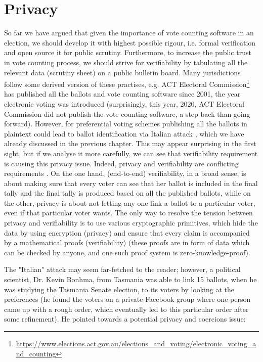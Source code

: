 \section{Privacy}
   So far we have argued that given the  importance of vote counting software in an election, we should 
   develop it with highest possible rigour, i.e. formal verification and open source it for public scrutiny. Furthermore, 
   to increase the public trust in vote counting process, we should strive for verifiability by tabulating all the 
   relevant data (scrutiny sheet) on a public bulletin board.  Many jurisdictions follow some derived version of these practises, e.g.  ACT Electoral 
   Commission\footnote{\url{https://www.elections.act.gov.au/elections_and_voting/electronic_voting_and_counting}}
   has published all the ballots and vote counting software since 2001, the year electronic voting  was introduced 
   (surprisingly,  this year,  2020,  ACT Electoral Commission did not  publish the vote counting software, a step back than 
   going forward).  However, for preferential voting schemes publishing all the ballots in plaintext could lead to ballot identification
   via Italian attack \citep{Otten}, which we have already discussed in the previous chapter.    This may appear surprising in the 
   first sight,  but if we analyse it more carefully,  we can see that verifiability requirement is causing this privacy issue.   Indeed, 
   privacy and verifiability are conflicting requirements \citep{JONKER20131}.  
   On the one hand,  (end-to-end) verifiability, in a broad sense,  is about making sure that
   every voter can see that her ballot is included in the final tally and the final tally is produced based on all the published ballots, 
   while on the other, privacy is about not letting any one link a ballot to a particular voter,  even if that particular voter wants.  
   The only way to resolve the tension between privacy 
   and verifiability is to use various cryptographic primitives,  which hide the data  by using encryption (privacy) and 
   ensure that every claim is accompanied by a mathematical proofs (verifiability) (these proofs are in form of data which 
   can be checked by anyone,  and one such proof system is zero-knowledge-proof).  
   
   
   The "Italian" attack may seem far-fetched to the reader; however,  a political scientist,  Dr. Kevin Bonhma,
   from Tasmania was able to link  15 ballots, when he was studying the Tasmania Senate election,  
   to its voters by looking at the preferences \citep{TasmaniaVoting}  (he found the voters on a private Facebook 
   group where one person came up with a rough order,  which eventually led to this particular order after 
   some refinement).  He pointed \citep{TasmaniaVoting} towards a potential privacy and coercions issue:
   
